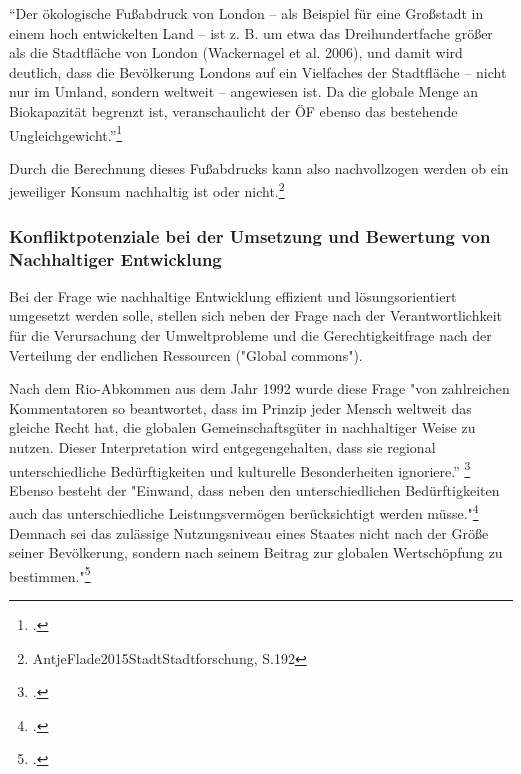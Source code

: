 \documentclass{scrartcl}
\begin{document}
\begin{displayquote}
“Der ökologische Fußabdruck von London – als Beispiel für eine Großstadt in einem hoch entwickelten Land – ist z. B. um etwa das Dreihundertfache größer als die Stadtfläche von London (Wackernagel et al. 2006), und damit wird deutlich, dass die Bevölkerung Londons auf ein Vielfaches der Stadtfläche – nicht nur im Umland, sondern weltweit – angewiesen ist. Da die globale Menge an Biokapazität begrenzt ist, veranschaulicht der ÖF ebenso das bestehende Ungleichgewicht.”\footcite{AntjeFlade2015StadtStadtforschung, S.192}
\end{displayquote} 

Durch die Berechnung dieses Fußabdrucks kann also nachvollzogen werden ob ein jeweiliger Konsum nachhaltig ist oder nicht.\footnote{AntjeFlade2015StadtStadtforschung, S.192 }



\subsubsection{Konfliktpotenziale bei der Umsetzung und Bewertung von Nachhaltiger Entwicklung}

Bei der Frage wie nachhaltige Entwicklung effizient und lösungsorientiert umgesetzt werden solle, stellen sich neben der Frage nach der Verantwortlichkeit für die Verursachung der Umweltprobleme und die Gerechtigkeitfrage nach der Verteilung der endlichen Ressourcen ("Global commons"). 

Nach dem Rio-Abkommen aus dem Jahr 1992 wurde diese Frage "von zahlreichen Kommentatoren so beantwortet, dass im Prinzip jeder Mensch weltweit das gleiche Recht hat, die globalen Gemeinschaftsgüter in nachhaltiger Weise zu nutzen. Dieser Interpretation wird entgegengehalten, dass sie regional unterschiedliche Bedürftigkeiten und kulturelle Besonderheiten ignoriere.” \footcite{NachhaltigeBrockhaus.de} Ebenso besteht der "Einwand, dass neben den unterschiedlichen Bedürftigkeiten auch das unterschiedliche Leistungsvermögen berücksichtigt werden müsse."\footcite{NachhaltigeBrockhaus.de} Demnach sei das zulässige Nutzungsniveau eines Staates nicht nach der Größe seiner Bevölkerung, sondern nach seinem Beitrag zur globalen Wertschöpfung zu bestimmen."\footcite{NachhaltigeBrockhaus.de}
\end{document}
